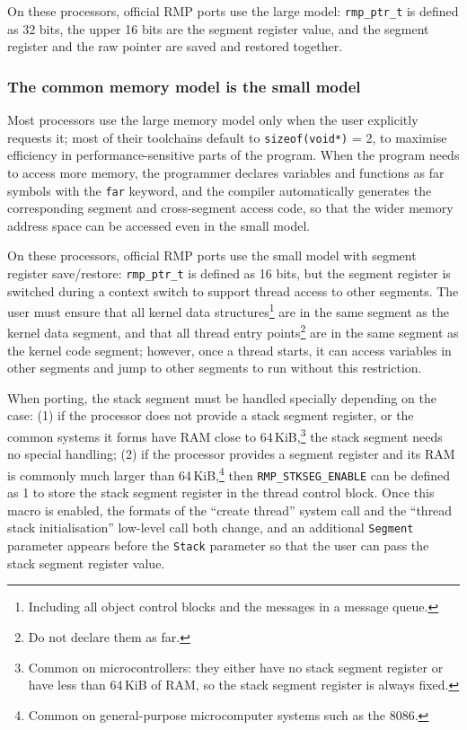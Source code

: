 On these processors, official RMP ports use the large model: \texttt{rmp\_ptr\_t} is defined as 32 bits, the upper 16 bits are the segment register value, and the segment register and the raw pointer are saved and restored together.

\subsubsection{The common memory model is the small model}

Most processors use the large memory model only when the user explicitly requests it; most of their toolchains default to \texttt{sizeof(void*)} = 2, to maximise efficiency in performance-sensitive parts of the program.
When the program needs to access more memory, the programmer declares variables and functions as far symbols with the \texttt{far} keyword, and the compiler automatically generates the corresponding segment and cross-segment access code, so that the wider memory address space can be accessed even in the small model.

On these processors, official RMP ports use the small model with segment register save/restore: \texttt{rmp\_ptr\_t} is defined as 16 bits, but the segment register is switched during a context switch to support thread access to other segments.
The user must ensure that all kernel data structures\footnote{Including all object control blocks and the messages in a message queue.} are in the same segment as the kernel data segment, and that all thread entry points\footnote{Do not declare them as far.} are in the same segment as the kernel code segment; however, once a thread starts, it can access variables in other segments and jump to other segments to run without this restriction.

When porting, the stack segment must be handled specially depending on the case: (1) if the processor does not provide a stack segment register, or the common systems it forms have RAM close to 64\,KiB,\footnote{Common on microcontrollers: they either have no stack segment register or have less than 64\,KiB of RAM, so the stack segment register is always fixed.} the stack segment needs no special handling; (2) if the processor provides a segment register and its RAM is commonly much larger than 64\,KiB,\footnote{Common on general-purpose microcomputer systems such as the 8086.} then \texttt{RMP\_STKSEG\_ENABLE} can be defined as 1 to store the stack segment register in the thread control block.
Once this macro is enabled, the formats of the ``create thread'' system call and the ``thread stack initialisation'' low-level call both change, and an additional \texttt{Segment} parameter appears before the \texttt{Stack} parameter so that the user can pass the stack segment register value.

